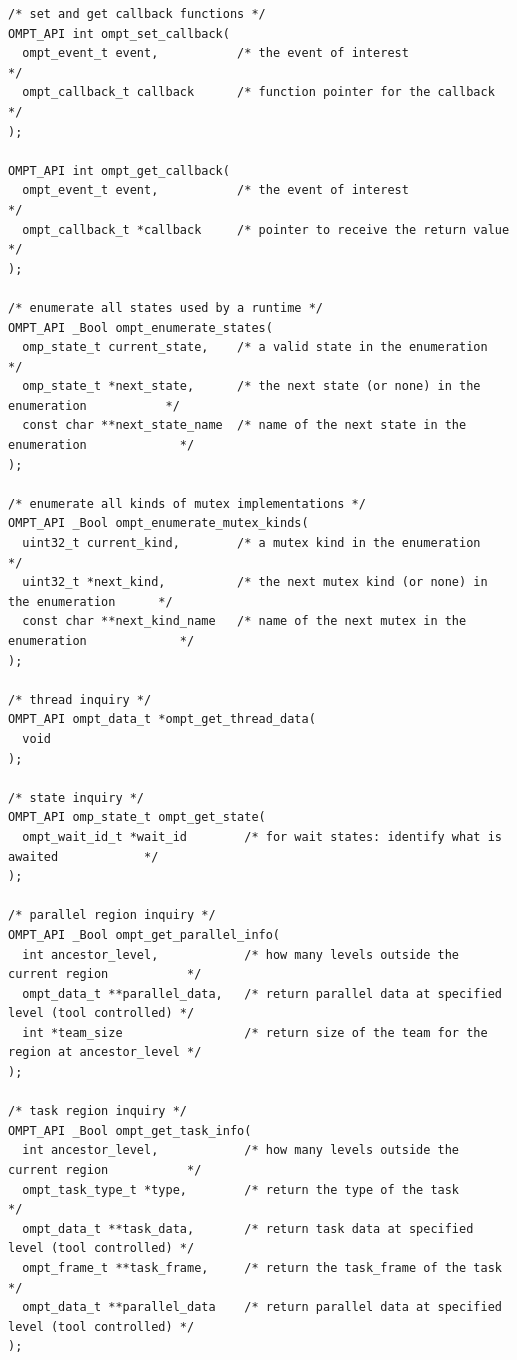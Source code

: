 \documentclass{article}
\begin{document}
\begin{verbatim}
/* set and get callback functions */
OMPT_API int ompt_set_callback( 
  ompt_event_t event,           /* the event of interest                                 */
  ompt_callback_t callback      /* function pointer for the callback                     */
);

OMPT_API int ompt_get_callback(
  ompt_event_t event,           /* the event of interest                                 */
  ompt_callback_t *callback     /* pointer to receive the return value                   */
);

/* enumerate all states used by a runtime */
OMPT_API _Bool ompt_enumerate_states(
  omp_state_t current_state,    /* a valid state in the enumeration                      */
  omp_state_t *next_state,      /* the next state (or none) in the enumeration           */
  const char **next_state_name  /* name of the next state in the enumeration             */
);

/* enumerate all kinds of mutex implementations */
OMPT_API _Bool ompt_enumerate_mutex_kinds(
  uint32_t current_kind,        /* a mutex kind in the enumeration                       */
  uint32_t *next_kind,          /* the next mutex kind (or none) in the enumeration      */
  const char **next_kind_name   /* name of the next mutex in the enumeration             */
);

/* thread inquiry */
OMPT_API ompt_data_t *ompt_get_thread_data(
  void
);

/* state inquiry */
OMPT_API omp_state_t ompt_get_state( 
  ompt_wait_id_t *wait_id        /* for wait states: identify what is awaited            */
);

/* parallel region inquiry */
OMPT_API _Bool ompt_get_parallel_info(
  int ancestor_level,            /* how many levels outside the current region           */
  ompt_data_t **parallel_data,   /* return parallel data at specified level (tool controlled) */
  int *team_size                 /* return size of the team for the region at ancestor_level */
);

/* task region inquiry */
OMPT_API _Bool ompt_get_task_info(
  int ancestor_level,            /* how many levels outside the current region           */
  ompt_task_type_t *type,        /* return the type of the task                          */
  ompt_data_t **task_data,       /* return task data at specified level (tool controlled) */
  ompt_frame_t **task_frame,     /* return the task_frame of the task                    */
  ompt_data_t **parallel_data    /* return parallel data at specified level (tool controlled) */
);


\end{verbatim}
\end{document}
